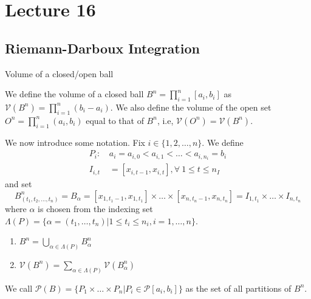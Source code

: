 \documentclass[../Analysis-3.tex]{subfiles}
\begin{document}
\chapter*{Lecture 16} %
\setcounter{chapter}{16} %
\setcounter{section}{0}

\section{Riemann-Darboux Integration}



\begin{Def}{Volume of a closed/open ball}{}

  We define the volume of a closed ball $B^n = \prod \limits_{i=1}^n [a_i, b_i]$ as $\mathcal{V}(B^n) = \prod \limits_{i=1}^n (b_i - a_i).$ We also define the volume of the open set $O^n = \prod \limits _{i=1}^n (a_i, b_i)$ equal to that of $B^n$, i.e, $\mathcal{V}(O^n) = \mathcal{V}(B^n)$.

\end{Def}

We now introduce some notation. Fix $i \in \{1,2, \dots, n\}$. We define
\begin{align*}
  P_i:\,  & a_i = a_{i,0} < a_{i,1} < \dots < a_{i,n_i} = b_i   \\
  I_{i,t} & = [x_{i,t-1}, x_{i,t}], \forall \ 1 \leq t \leq n_I
\end{align*}
and set
\[
  B_{(t_1,t_2,\dots ,t_n)}^n = B_\alpha = [x_{1,t_1-1}, x_{1,t_1}] \times \dots \times [x_{n,t_n-1}, x_{n,t_n}] = I_{1,t_1} \times \dots \times I_{n,t_n}
\]
where $\alpha$ is chosen from the indexing set $\Lambda (P) = \{\alpha = (t_1,\dots ,t_n) | 1 \leq t_i \leq n_i, i=1, \dots , n\}$.

\begin{noteBox}

  \begin{enumerate}
    \item $B^n = \bigcup \limits _{\alpha \in \Lambda (P)} B^n_\alpha$
    \item $\mathcal{V}(B^n) = \sum \limits _{\alpha \in \Lambda (P)} \mathcal{V}(B_\alpha ^n)$
  \end{enumerate}

\end{noteBox}

We call $\mathcal{P}(B) = \{P_1 \times \dots \times P_n | P_i \in \mathcal{P}[a_i, b_i]\}$ as the set of all partitions of $B^n$.
\end{document}
